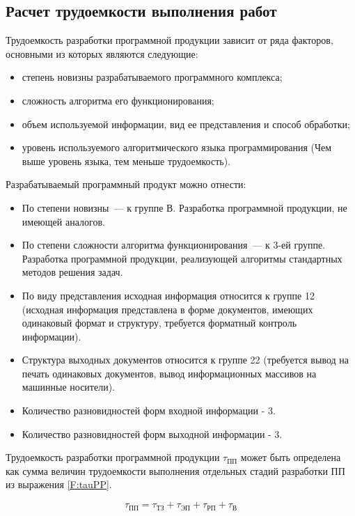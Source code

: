\subsection{Расчет трудоемкости выполнения работ}
Трудоемкость разработки программной продукции зависит от ряда факторов, основными из которых являются следующие:
\begin{itemize}
\item степень новизны разрабатываемого программного комплекса;
\item сложность алгоритма его функционирования;
\item объем используемой информации, вид ее представления и способ обработки;
\item уровень используемого алгоритмического языка программирования (Чем выше уровень языка, тем меньше трудоемкость). 
\end{itemize}

Разрабатываемый программный продукт можно отнести:
\begin{itemize}
\item По степени новизны~--- к группе В. Разработка программной продукции, не имеющей аналогов.
\item По степени сложности алгоритма функционирования~--– к 3-ей группе. Разработка программной продукции, реализующей алгоритмы стандартных методов решения задач.
\item По виду представления исходная информация относится к группе 12 (исходная информация представлена в форме документов, имеющих одинаковый формат и структуру, требуется форматный контроль информации).
\item Структура выходных документов относится к группе 22 (требуется вывод на печать одинаковых документов, вывод информационных массивов на машинные носители).
\item Количество разновидностей форм входной информации - 3.
\item Количество разновидностей форм выходной информации - 3.
\end{itemize}

Трудоемкость разработки программной продукции $\tau_{\text{ПП}}$ может быть определена как сумма величин трудоемкости выполнения отдельных стадий разработки ПП из выражения \ref{F:tauPP}.

\begin{equation}
\tau_{\text{ПП}} = \tau_{\text{ТЗ}} + \tau_{\text{ЭП}} + \tau_{\text{РП}} + \tau_{\text{В}}
\label{F:tauPP}
\end{equation}

